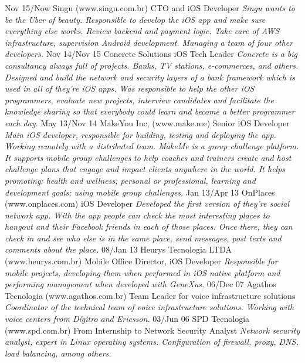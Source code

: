 \documentclass[]{friggeri-cv}
\begin{document}
\begin{entrylist}
  \entry
    {Nov 15/Now}
    {Singu (www.singu.com.br)}
    {CTO and iOS Developer}
    {\emph{Singu wants to be the Uber of beauty. Responsible to develop the iOS app and make sure everything else works. Review backend and payment logic. Take care of AWS infrastructure, supervision Android development. Managing a team of four other developers.}}
  \entry
    {Nov 14/Nov 15}
    {Concrete Solutions}
    {iOS Tech Leader}
    {\emph{Concrete is a big consultancy always full of projects. Banks, TV stations, e-commerces, and others. Designed and build the network and security layers of a bank framework which is used in all of they're iOS apps. Was responsible to help the other iOS programmers, evaluate new projects, interview candidates and facilitate the knowledge sharing so that everybody could learn and become a better programmer each day.}}
  \entry
    {May 13/Nov 14}
    {MakeYou Inc, (www.make.me)}
    {Senior iOS Developer}
    {\emph{Main iOS developer, responsible for building, testing and deploying the app. Working remotely with a distributed team.
MakeMe is a group challenge platform. It supports mobile group challenges to help coaches and trainers create and host challenge plans that engage and impact clients anywhere in the world. It  helps promoting: health and wellness; personal or professional, learning and development goals; using mobile group challenges.}}
  \entry
    {Jan 13/Apr 13}
    {OnPlaces (www.onplaces.com)}
    {iOS Developer}
    {\emph{Developed the first version of they're social network app. With the app people can check the most interesting places to hangout and their Facebook friends in each of those places. Once there, they can check in and see who else is in the same place, send messages, post texts and comments about the place.}}
  \entry
    {08/Jan 13}
    {Heurys Tecnologia LTDA (www.heurys.com.br)}
    {Mobile Office Director, iOS Developer}
    {\emph{Responsible for mobile projects, developing them when performed in iOS native platform and performing management when developed with GeneXus.}}
  \entry
    {06/Dec 07}
    {Agathos Tecnologia (www.agathos.com.br)}
    {Team Leader for voice infrastructure solutions}
    {\emph{Coordinator of the technical team of voice infrastructure solutions. Working with voice centers from Dígitro and Ericsson.}}
  \entry
    {03/Jun 06}
    {SPD Tecnologia (www.spd.com.br)}
    {From Internship to Network Security Analyst}
    {\emph{Network security analyst, expert in Linux operating systems. Configuration of firewall, proxy, DNS, load balancing, among others.}}
\end{entrylist}
\end{document}
